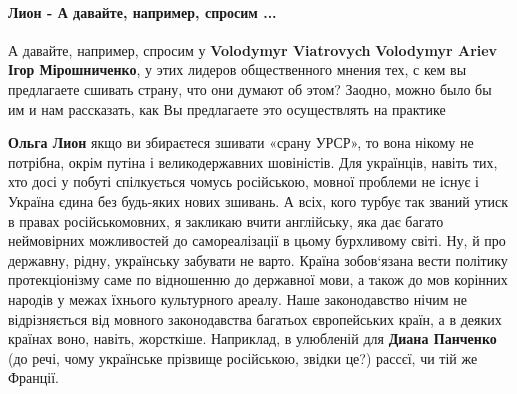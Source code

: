  
 
 
 
 

\paragraph{Лион - А давайте, например, спросим ...}

\begin{itemize}


А давайте, например, спросим у \textbf{Volodymyr Viatrovych} \textbf{Volodymyr
Ariev} \textbf{Ігор Мірошниченко}, у этих лидеров общественного мнения тех, с
кем вы предлагаете сшивать страну, что они думают об этом? Заодно, можно было
бы им и нам рассказать, как Вы предлагаете это осуществлять на практике

\begin{itemize}
 

\textbf{Ольга Лион} якщо ви збираєтеся зшивати «срану УРСР», то вона нікому не
потрібна, окрім путіна і великодержавних шовіністів. Для українців, навіть тих,
хто досі у побуті спілкується чомусь російською, мовної проблеми не існує і
Україна єдина без будь-яких нових зшивань. А всіх, кого турбує так званий утиск
в правах російськомовних, я закликаю вчити англійську, яка дає багато
неймовірних можливостей до самореалізації в цьому бурхливому світі. Ну, й про
державну, рідну, українську забувати не варто. Країна зобов‘язана вести
політику протекціонізму саме по відношенню до державної мови, а також до мов
корінних народів у межах їхнього культурного ареалу. Наше законодавство нічим
не відрізняється від мовного законодавства багатьох європейських країн, а в
деяких країнах воно, навіть, жорсткіше. Наприклад, в улюбленій для \textbf{Диана
Панченко} (до речі, чому українське прізвище російською, звідки це?) рассєї, чи
тій же Франції.


\end{itemize}
\end{itemize}
